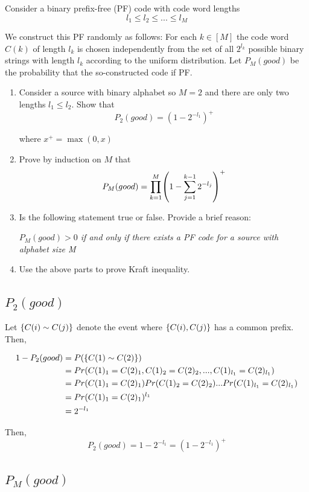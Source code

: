 \documentclass{article}
\begin{document}
Consider a binary prefix-free (PF) code with code word lengths
$$
    l_1 \leq l_2 \leq ... \leq l_M
$$

We construct this PF randomly as follows: For each $k \in [M]$ the code word $C(k)$ of length $l_k$ is chosen independently from the set of all $2^{l_k}$ possible binary strings with length $l_k$ according to the uniform distribution. Let $P_M(good)$ be the probability that the so-constructed code if PF.

\begin{enumerate}
\item Consider a source with binary alphabet so $M=2$ and there are only two lengths $l_1 \leq l_2$. Show that
$$
    P_2(good) = (1 - 2^{-l_1})^+
$$

where $x^+ = \max(0, x)$

\item Prove by induction on $M$ that
$$
    P_M(good) = \prod_{k=1}^M \tuple*{1 - \sum_{j=1}^{k-1} 2^{-l_j}}^+
$$

\item Is the following statement true or false. Provide a brief reason:

\textit{$P_M(good) > 0$ if and only if there exists a PF code for a source with alphabet size M}

\item Use the above parts to prove Kraft inequality.
\end{enumerate}

\subsection{$P_2(good)$}

Let $\{C(i) \sim C(j)\}$ denote the event where $\{C(i), C(j)\}$ has a common prefix. Then,

\begin{align*}
    1 - P_2(good)
    &= P(\{C(1) \sim C(2)\}) \\
    &= Pr(C(1)_1 = C(2)_1, C(1)_2 = C(2)_2, ..., C(1)_{l_1} = C(2)_{l_1}) \\
    &= Pr(C(1)_1 = C(2)_1) Pr(C(1)_2 = C(2)_2) ... Pr(C(1)_{l_1} = C(2)_{l_1}) \\
    &= Pr(C(1)_1 = C(2)_1)^{l_1} \\
    &= 2^{-l_1}
\end{align*}

Then,
$$
    P_2(good) = 1 - 2^{-l_1} = (1 - 2^{-l_1})^+
$$

\subsection{$P_M(good)$}
\end{document}
